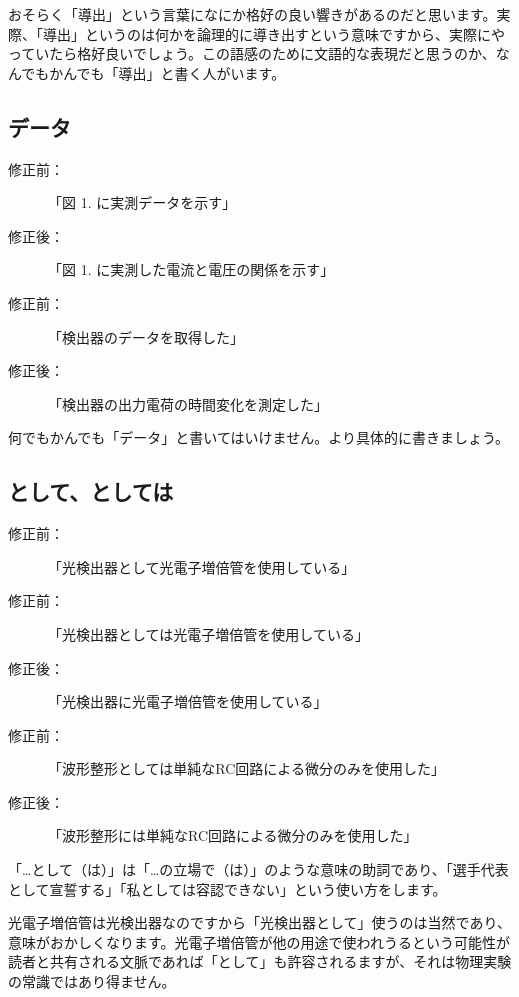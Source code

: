 おそらく「導出」という言葉になにか格好の良い響きがあるのだと思います。実際、「導出」というのは何かを論理的に導き出すという意味ですから、実際にやっていたら格好良いでしょう。この語感のために文語的な表現だと思うのか、なんでもかんでも「導出」と書く人がいます。

\subsection{データ}

\begin{description}
\item[修正前：]「図 1. に実測データを示す」
\item[修正後：]「図 1. に実測した電流と電圧の関係を示す」
\end{description}
\begin{description}
\item[修正前：]「検出器のデータを取得した」
\item[修正後：]「検出器の出力電荷の時間変化を測定した」
\end{description}

何でもかんでも「データ」と書いてはいけません。より具体的に書きましょう。

\subsection{として、としては}

\begin{description}
\item[修正前：]「光検出器として光電子増倍管を使用している」
\item[修正前：]「光検出器としては光電子増倍管を使用している」
\item[修正後：]「光検出器に光電子増倍管を使用している」
\end{description}

\begin{description}
\item[修正前：]「波形整形としては単純なRC回路による微分のみを使用した」
\item[修正後：]「波形整形には単純なRC回路による微分のみを使用した」
\end{description}

「…として（は）」は「…の立場で（は）」のような意味の助詞であり、「選手代表として宣誓する」「私としては容認できない」という使い方をします。

光電子増倍管は光検出器なのですから「光検出器として」使うのは当然であり、意味がおかしくなります。光電子増倍管が他の用途で使われうるという可能性が読者と共有される文脈であれば「として」も許容されるますが、それは物理実験の常識ではあり得ません。

